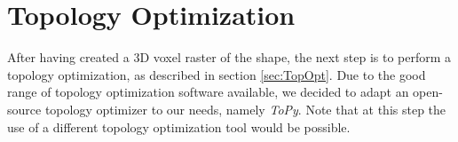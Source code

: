 \section{Topology Optimization}
\label{sec:ToPy}
After having created a 3D voxel raster of the shape, the next step is to perform a topology optimization, as described in section \ref{sec:TopOpt}. 
Due to the good range of topology optimization software available, we decided to adapt an open-source topology optimizer to our needs, namely \emph{ToPy}. Note that at this step the use of a different topology optimization tool would be possible.








